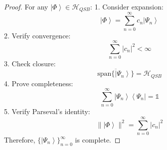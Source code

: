 \documentclass[12pt]{article}
\newcommand{\ket}[1]{\left|#1\right\rangle}
\newcommand{\bra}[1]{\left\langle#1\right|}
\begin{document}
\begin{proof}
For any $\ket{\Phi} \in \mathcal{H}_{QSB}$:
1. Consider expansion:
\begin{equation}
\ket{\Phi} = \sum_{n=0}^{\infty} c_n\ket{\Psi_n}
\end{equation}
2. Verify convergence:
\begin{equation}
\sum_{n=0}^{\infty} |c_n|^2 < \infty
\end{equation}
3. Check closure:
\begin{equation}
\overline{\text{span}\{\ket{\Psi_n}\}} = \mathcal{H}_{QSB}
\end{equation}
4. Prove completeness:
\begin{equation}
\sum_{n=0}^{\infty} \ket{\Psi_n}\bra{\Psi_n} = \mathbb{1}
\end{equation}
5. Verify Parseval's identity:
\begin{equation}
\|\ket{\Phi}\|^2 = \sum_{n=0}^{\infty} |c_n|^2
\end{equation}
Therefore, $\{\ket{\Psi_n}\}_{n=0}^{\infty}$ is complete.
\end{proof}
\end{document}
